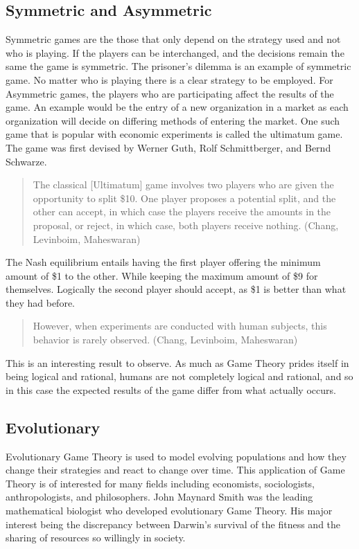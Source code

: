 \documentclass[12pt]{article}
\begin{document}
 	\subsection{Symmetric and Asymmetric}
 		Symmetric games are the those that only depend on the strategy used and not who is playing. If the players can be interchanged, and the decisions remain the same the game is symmetric. The prisoner's dilemma is an example of symmetric game. No matter who is playing there is a clear strategy to be employed. For Asymmetric games, the players who are participating affect the results of the game. An example would be the entry of a new organization in a market as each organization will decide on differing methods of entering the market. One such game that is popular with economic experiments is called the ultimatum game. The game was first devised by Werner Guth, Rolf Schmittberger, and Bernd Schwarze.
 		\begin{quotation}
 			 The classical [Ultimatum] game involves two players who are given the opportunity to split \$10. One player proposes a potential split, and the other can accept, in which case the players receive the amounts in the proposal, or reject, in which case, both players receive nothing. (Chang, Levinboim, Maheswaran)
 		\end{quotation} 
 			 The Nash equilibrium entails having the first player offering the minimum amount of \$1 to the other. While keeping the maximum amount of \$9 for themselves. Logically the second player should accept, as \$1 is better than what they had before. 
 			 
 			 \begin{quote}
 			 	However, when experiments are conducted with human subjects, this behavior is rarely observed.  (Chang, Levinboim, Maheswaran)
 			\end{quote}
 		This is an interesting result to observe. As much as Game Theory prides itself in being logical and rational, humans are not completely logical and rational, and so in this case the expected results of the game differ from what actually occurs.
 	 \subsection{Evolutionary}
 	 	Evolutionary Game Theory is used to model evolving populations and how they change their strategies and react to change over time. This application of Game Theory is of interested for many fields including economists, sociologists, anthropologists, and philosophers. John Maynard Smith was the leading mathematical biologist who developed evolutionary Game Theory. His major interest being the discrepancy between Darwin's survival of the fitness and the sharing of resources so willingly in society.
\end{document}
